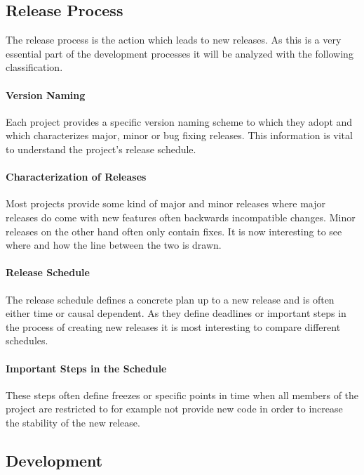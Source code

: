 \subsection{Release Process}

The release process is the action which leads to new releases. As this is a
very essential part of the development processes it will be analyzed with the
following classification.

\paragraph{Version Naming}

Each project provides a specific version naming scheme to which they adopt and
which characterizes major, minor or bug fixing releases. This information is
vital to understand the project's release schedule.

\paragraph{Characterization of Releases}

Most projects provide some kind of major and minor releases where major
releases do come with new features often backwards incompatible changes. Minor
releases on the other hand often only contain fixes. It is now interesting to
see where and how the line between the two is drawn.

\paragraph{Release Schedule}

The release schedule defines a concrete plan up to a new release and is often
either time or causal dependent. As they define deadlines or important steps in
the process of creating new releases it is most interesting to compare
different schedules.

\paragraph{Important Steps in the Schedule}

These steps often define freezes or specific points in time when all members of
the project are restricted to for example not provide new code in order to
increase the stability of the new release.

\subsection{Development}

